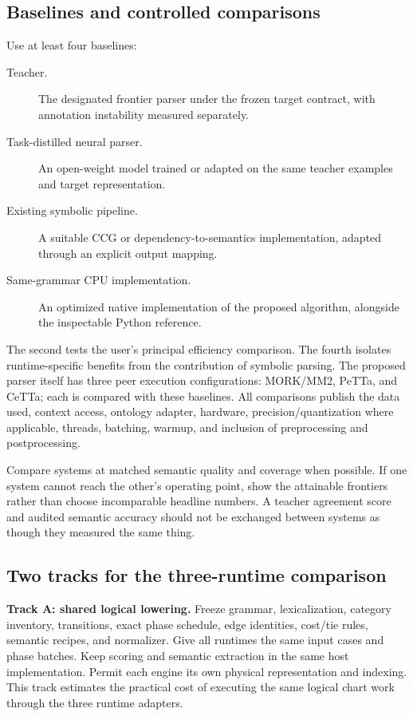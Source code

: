 \documentclass[11pt,a4paper]{article}
\begin{document}
\subsection{Baselines and controlled comparisons}
Use at least four baselines:
\begin{description}
  \item[Teacher.] The designated frontier parser under the frozen target
  contract, with annotation instability measured separately.
  \item[Task-distilled neural parser.] An open-weight model trained or adapted
  on the same teacher examples and target representation.
  \item[Existing symbolic pipeline.] A suitable CCG or dependency-to-semantics
  implementation, adapted through an explicit output mapping.
  \item[Same-grammar CPU implementation.] An optimized native implementation
  of the proposed algorithm, alongside the inspectable Python reference.
\end{description}
The second tests the user's principal efficiency comparison. The fourth
isolates runtime-specific benefits from the contribution of symbolic parsing.
The proposed parser itself has three peer execution configurations: MORK/MM2,
PeTTa, and CeTTa; each is compared with these baselines.
All comparisons publish the data used, context access, ontology adapter,
hardware, precision/quantization where applicable, threads, batching,
warmup, and inclusion of preprocessing and postprocessing.

Compare systems at matched semantic quality and coverage when possible.
If one system cannot reach the other's operating point, show the attainable
frontiers rather than choose incomparable headline numbers. A teacher
agreement score and audited semantic accuracy should not be exchanged
between systems as though they measured the same thing.

\subsection{Two tracks for the three-runtime comparison}\label{sec:runtimecomparison}
\textbf{Track A: shared logical lowering.}
Freeze grammar, lexicalization, category inventory, transitions, exact
phase schedule, edge identities, cost/tie rules, semantic recipes, and
normalizer. Give all runtimes the same input cases and phase batches.
Keep scoring and semantic extraction in the same host implementation.
Permit each engine its own physical representation and indexing.
This track estimates the practical cost of executing the same logical
chart work through the three runtime adapters.
\end{document}
